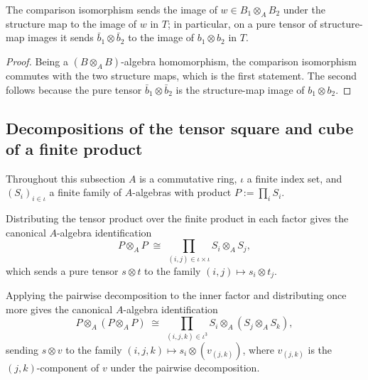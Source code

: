 \begin{lemma}
  \label{pa-lem:tensorAwayEquiv_tmul}
  \leanok

  The comparison isomorphism sends the image of \(w \in B_1 \otimes_A B_2\) under the structure
  map to the image of \(w\) in \(T\); in particular, on a pure tensor of structure-map images it
  sends \(\bar b_1 \otimes \bar b_2\) to the image of \(b_1 \otimes b_2\) in \(T\).
\end{lemma}
\begin{proof}
  \leanok
  Being a \((B \otimes_A B)\)-algebra homomorphism, the comparison isomorphism commutes with the
  two structure maps, which is the first statement. The second follows because the pure tensor
  \(\bar b_1 \otimes \bar b_2\) is the structure-map image of \(b_1 \otimes b_2\).
\end{proof}

\subsection{Decompositions of the tensor square and cube of a finite product}

Throughout this subsection \(A\) is a commutative ring, \(\iota\) a finite index set, and
\((S_i)_{i \in \iota}\) a finite family of \(A\)-algebras with product \(P := \prod_{i} S_i\).

\begin{definition}
  \label{pa-def:piDoubleEquivA}
  \leanok

  Distributing the tensor product over the finite product in each factor gives the canonical
  \(A\)-algebra identification
  \[
    P \otimes_A P \;\cong\; \prod_{(i,j) \in \iota \times \iota} S_i \otimes_A S_j ,
  \]
  which sends a pure tensor \(s \otimes t\) to the family \((i,j) \mapsto s_i \otimes t_j\).
\end{definition}

\begin{definition}
  \label{pa-def:piTripleEquivA}
  \leanok

  Applying the pairwise decomposition to the inner factor and distributing once more gives the
  canonical \(A\)-algebra identification
  \[
    P \otimes_A (P \otimes_A P) \;\cong\;
      \prod_{(i,j,k) \in \iota^3} S_i \otimes_A (S_j \otimes_A S_k) ,
  \]
  sending \(s \otimes v\) to the family \((i,j,k) \mapsto s_i \otimes (v_{(j,k)})\), where
  \(v_{(j,k)}\) is the \((j,k)\)-component of \(v\) under the pairwise decomposition.
\end{definition}

